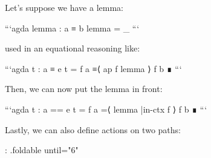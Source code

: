 Let's suppose we have a lemma:
{%
```agda
  lemma : a ≡ b
  lemma = _
```
{%
used in an equational reasoning like:
{%
```agda
  t : a ≡ e
  t = f a ≡⟨ ap f lemma ⟩
      f b
      ∎
```
{%

Then, we can now put the lemma in front:
{%
```agda
  t : a == e
  t = f a =⟨ lemma |in-ctx f ⟩
      f b
      ∎
```
{%

Lastly, we can also define actions on two paths:

{: .foldable until="6" }
\begin{code}%
\>[0]\<%
\\
\>[0][@{}l@{\AgdaIndent{0}}]%
\>[2]\AgdaSymbol{:}\AgdaSpace{}%
\AgdaSymbol{\{}\AgdaSpace{}%
\AgdaSymbol{:}\AgdaSpace{}%
\AgdaSpace{}%
\AgdaSymbol{\}}\AgdaSpace{}%
\AgdaSymbol{\{}\AgdaSpace{}%
\AgdaSymbol{:}\AgdaSpace{}%
\AgdaSpace{}%
\AgdaSymbol{\}}\AgdaSpace{}%
\AgdaSymbol{\{}\AgdaSpace{}%
\AgdaSymbol{:}\AgdaSpace{}%
\AgdaSpace{}%
\AgdaSymbol{\}}\AgdaSpace{}%
\AgdaSymbol{\{}\AgdaSpace{}%
\AgdaSpace{}%
\AgdaSymbol{:}\AgdaSpace{}%
\AgdaSymbol{\}}\AgdaSpace{}%
\AgdaSymbol{\{}\AgdaSpace{}%
\AgdaSpace{}%
\AgdaSymbol{:}\AgdaSpace{}%
\AgdaSymbol{\}}\<%
\\
%
\>[2]\AgdaSpace{}%
\AgdaSymbol{(}\AgdaSpace{}%
\AgdaSymbol{:}\AgdaSpace{}%
\AgdaSpace{}%
\AgdaSpace{}%
\AgdaSpace{}%
\AgdaSpace{}%
\AgdaSymbol{)}\<%
\\
%
\>[2]\AgdaSpace{}%
\AgdaSymbol{(}\AgdaSpace{}%
\AgdaOperator{\AgdaDatatype{==}}\AgdaSpace{}%
\AgdaSymbol{)}\AgdaSpace{}%
\AgdaSpace{}%
\AgdaSymbol{(}\AgdaSpace{}%
\AgdaOperator{\AgdaDatatype{==}}\AgdaSpace{}%
\AgdaSymbol{)}\<%
\\
%
\>[2]\AgdaComment{--------------------------}\<%
\\
%
\>[2]\AgdaSpace{}%
\AgdaSpace{}%
\AgdaSpace{}%
%
\>[13]\AgdaOperator{\AgdaDatatype{==}}\AgdaSpace{}%
\AgdaSpace{}%
\AgdaSpace{}%
\<%
\\
%
\\[\AgdaEmptyExtraSkip]%
\>[0]\AgdaSpace{}%
\AgdaSpace{}%
\AgdaSpace{}%
\AgdaSpace{}%
\AgdaSymbol{=}\AgdaSpace{}%
\<%
\end{code}

}}}}}}
